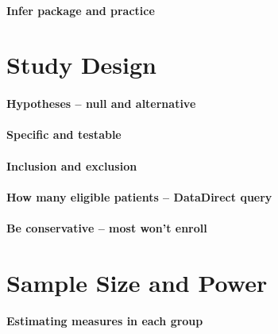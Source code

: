 \documentclass[]{book}
\theoremstyle{definition}
\theoremstyle{definition}
\theoremstyle{definition}
\theoremstyle{remark}
\begin{document}
\hypertarget{infer-package-and-practice}{%
\subsubsection{Infer package and
practice}\label{infer-package-and-practice}}

\hypertarget{study-design}{%
\chapter{Study Design}\label{study-design}}

\hypertarget{hypotheses-null-and-alternative}{%
\subsubsection{Hypotheses -- null and
alternative}\label{hypotheses-null-and-alternative}}

\hypertarget{specific-and-testable}{%
\subsubsection{Specific and testable}\label{specific-and-testable}}

\hypertarget{inclusion-and-exclusion}{%
\subsubsection{Inclusion and exclusion}\label{inclusion-and-exclusion}}

\hypertarget{how-many-eligible-patients-datadirect-query}{%
\subsubsection{How many eligible patients -- DataDirect
query}\label{how-many-eligible-patients-datadirect-query}}

\hypertarget{be-conservative-most-wont-enroll}{%
\subsubsection{Be conservative -- most won't
enroll}\label{be-conservative-most-wont-enroll}}

\hypertarget{sample-size-and-power}{%
\chapter{Sample Size and Power}\label{sample-size-and-power}}

\hypertarget{estimating-measures-in-each-group}{%
\subsubsection{Estimating measures in each
group}\label{estimating-measures-in-each-group}}
\end{document}
